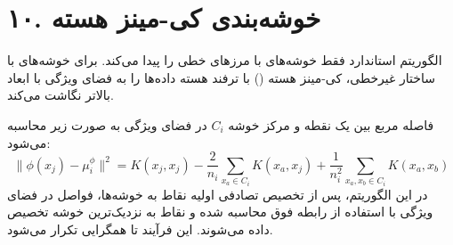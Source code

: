 \documentclass{article}
\begin{document}
\section*{۱۰. خوشه‌بندی کی-مینز هسته}
الگوریتم  استاندارد فقط خوشه‌های با مرزهای خطی را پیدا می‌کند. برای خوشه‌های با ساختار غیرخطی، کی-مینز هسته () با ترفند هسته داده‌ها را به فضای ویژگی با ابعاد بالاتر نگاشت می‌کند.

فاصله مربع بین یک نقطه و مرکز خوشه $C_i$ در فضای ویژگی به صورت زیر محاسبه می‌شود:
\[
\|\phi(x_j) - \mu^{\phi}_i\|^2 = K(x_j, x_j) - \frac{2}{n_i} \sum_{x_a \in C_i} K(x_a, x_j) + \frac{1}{n_i^2} \sum_{x_a, x_b \in C_i} K(x_a, x_b)
\]
در این الگوریتم، پس از تخصیص تصادفی اولیه نقاط به خوشه‌ها، فواصل در فضای ویژگی با استفاده از رابطه فوق محاسبه شده و نقاط به نزدیک‌ترین خوشه تخصیص داده می‌شوند. این فرآیند تا همگرایی تکرار می‌شود.
\end{document}
